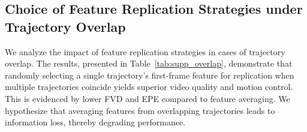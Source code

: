 \documentclass{article}
\begin{document}
\begin{table}[!t]
    \centering
    \begin{minipage}{0.48\textwidth}
    \vspace{-1em}
     \caption{Impact of feature replication strategies when multiple motion trajectories overlap.}
        \centering
        \renewcommand\tabcolsep{6.5pt}
        \label{tab:supp_overlap}
    \end{minipage}%
    \hfill
    \begin{minipage}{0.48\textwidth}
    \vspace{-1em}
      \caption{Impact of using a dense-to-sampling training strategy.}
        \centering
        \renewcommand\tabcolsep{2.2pt}
        \label{tab:abla_track_num}
    \end{minipage}
\end{table}


\subsection{Choice of Feature Replication Strategies under Trajectory Overlap}
We analyze the impact of feature replication strategies in cases of trajectory overlap. The results, presented in Table~\ref{tab:supp_overlap}, demonstrate that randomly selecting a single trajectory's first-frame feature for replication when multiple trajectories coincide yields superior video quality and motion control. This is evidenced by lower FVD and EPE compared to feature averaging. We hypothesize that averaging features from overlapping trajectories leads to information loss, thereby degrading performance.
\end{document}
